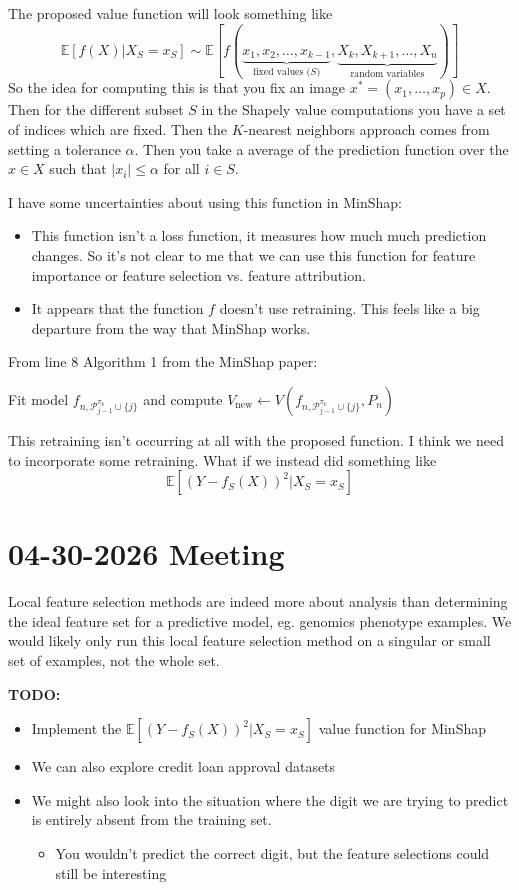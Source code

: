 \documentclass{article}
\newcommand{\E}{\mathbb{E}}
\begin{document}
The proposed value function will look something like 
\[ 
\E [f(X) |X_S = x_S] \sim \E [f(\underbrace{x_1, x_2, \dots , x_{k-1}}_\text{fixed values ($S$)}, \underbrace{X_k, X_{k+1}, \dots,X_n}_\text{random variables})]
\]
So the idea for computing this is that you fix an image $x^*=(x_1, \dots, x_p)\in X.$ Then for the different subset $S$ in the Shapely value computations you have a set of indices which are fixed. Then the $K$-nearest neighbors approach comes from setting a tolerance $\alpha$. Then you take a average of the prediction function over the $x\in X$ such that $|x_i|\le \alpha$ for all $i \in S.$ 

I have some uncertainties about using this function in MinShap:

{\color{blue}
\begin{itemize}
    \item This function isn't a loss function, it measures how much much prediction changes. So it's not clear to me that we can use this function for feature importance or feature selection vs. feature attribution. 
    \item It appears that the function $f$ doesn't use retraining. This feels like a big departure from the way that MinShap works. 
\end{itemize}
}

From line 8 Algorithm 1 from the MinShap paper: 

{ \centering Fit model $f_{n,\mathcal{P}_{j-1}^{\pi_k} \cup \{j\}}$ and compute $V_{\text{new}} \leftarrow V(f_{n,\mathcal{P}_{j-1}^{\pi_k} \cup \{j\}}, P_n)$ \par}

This retraining isn't occurring at all with the proposed function. I think we need to incorporate some retraining. What if we instead did something like 
\[ 
\E[(Y- f_S(X))^2|X_S=x_S]
\]

\section{04-30-2026 Meeting}
Local feature selection methods are indeed more about analysis than determining the ideal feature set for a predictive model, eg. genomics phenotype examples. We would likely only run this local feature selection method on a singular or small set of examples, not the whole set. {\color{red} \textbf{TODO:}
\begin{itemize} 
    \item Implement the $\E[(Y- f_S(X))^2|X_S=x_S]$ value function for MinShap
    \item We can also explore credit loan approval datasets
    \item We might also look into the situation where the digit we are trying to predict is entirely absent from the training set. 
    \begin{itemize}
        \item You wouldn't predict the correct digit, but the feature selections could still be interesting
    \end{itemize}
\end{itemize}}
\end{document}
